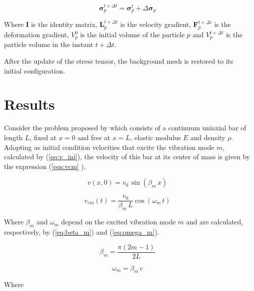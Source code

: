 \documentclass[preprint,12pt]{elsarticle}
\begin{document}
	\begin{equation}
	    \boldsymbol{\sigma}_p^{t+\Delta t}=\boldsymbol{\sigma}_p^t + \Delta \boldsymbol{\sigma}_p
        \label{eq:sigma}
	\end{equation}
	
	\noindent Where $\textbf{I}$ is the identity matrix, $\textbf{L}_p^{t+\Delta t}$ is the velocity gradient, $\textbf{F}_p^{t+\Delta t}$ is the deformation gradient, $V_p^0$ is the initial volume of the particle $p$ and $V_p^{t+\Delta t}$ is the particle volume in the instant $t+\Delta t$.
	
	After the update of the stress tensor, the background mesh is restored to its initial configuration.

	\section{Results}
	    Consider the problem proposed by \cite{bardenhagen_energy_2002} which consists of a continuum uniaxial bar of length $L$, fixed at $x=0$ and free at $x=L$, elastic modulus $E$ and density $\rho $. Adopting as initial condition velocities that excite the vibration mode $m$, calculated by (\ref{eq:v_ini}), the velocity of this bar at its center of mass is given by the expression (\ref{eqs:vcm} ).
	    
	    \begin{equation}
	        v(x,0)=v_0\,\sin(\beta_m\,x)
	        \label{eq:v_ini}
	    \end{equation}
	    
	    \begin{equation}
		    v_{cm}(t)=\frac{v_{0}}{\beta_{m}\,L}\cos(\omega_{m}\,t)
		    \label{eqs:vcm}
	    \end{equation}
	    
	    \noindent Where $\beta_m$ and $\omega_m$ depend on the excited vibration mode $m$ and are calculated, respectively, by (\ref{eq:beta_m}) and (\ref{eq:omega_m}).
	    
	    \begin{equation}
		    \beta_{m}=\frac{\pi(2m-1)}{2L}	
		    \label{eq:beta_m}
	    \end{equation}
	    
        \begin{equation}
            \omega_m=\beta_m\,c
            \label{eq:omega_m}
        \end{equation}
        
        \noindent Where 
        
\end{document}
